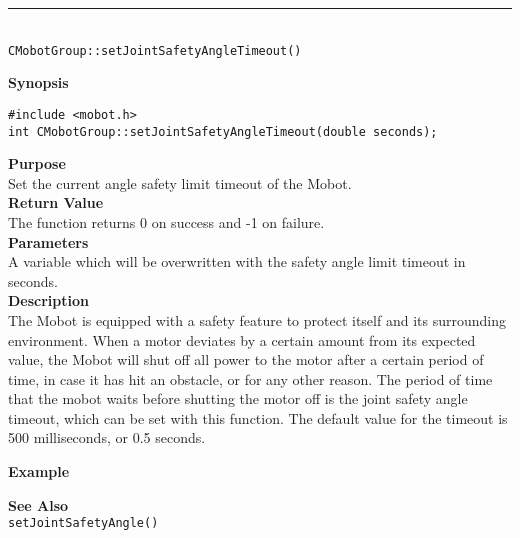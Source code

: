 \noindent
\vspace{5pt}
\rule{4.5in}{0.015in}\\
\noindent
{\LARGE \texttt{CMobotGroup::setJointSafetyAngleTimeout()}}\\
{}

\noindent
{\bf Synopsis}
\vspace{-8pt}
\begin{verbatim}
#include <mobot.h>
int CMobotGroup::setJointSafetyAngleTimeout(double seconds);
\end{verbatim}

\noindent
{\bf Purpose}\\
Set the current angle safety limit timeout of the Mobot.\\

\noindent
{\bf Return Value}\\
The function returns 0 on success and -1 on failure.\\

\noindent
{\bf Parameters}\\
A variable which will be overwritten with the safety angle limit timeout in seconds.\\

\noindent
{\bf Description}\\
The Mobot is equipped with a safety feature to protect itself and its surrounding
environment. When a motor deviates by a certain amount from its expected value, 
the Mobot will shut off all power to the motor after a certain period of time,
in case it has hit an obstacle, or for any other reason. The period of time that the
mobot waits before shutting the motor off is the joint safety angle timeout, which
can be set with this function. The default value for the timeout is 500 milliseconds,
or 0.5 seconds.
 
\noindent
{\bf Example}\\
\noindent

\noindent
{\bf See Also}\\
\texttt{setJointSafetyAngle()}\\



